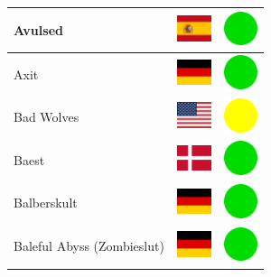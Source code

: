 \documentclass[12pt, a4paper, twoside]{report}
\begin{document}
\begin{center}
\begin{longtable}{|p{5cm}|p{2cm}|p{2cm}|}
 Avulsed                                                    & \includegraphics[width=1cm]{../img/flags/es} &   \includegraphics[width=1cm]{../likes/y} \\ \hline
 Axit                                                       & \includegraphics[width=1cm]{../img/flags/de} &   \includegraphics[width=1cm]{../likes/y} \\ \hline
 Bad Wolves                                                 & \includegraphics[width=1cm]{../img/flags/us} &   \includegraphics[width=1cm]{../likes/m} \\ \hline
 Baest                                                      & \includegraphics[width=1cm]{../img/flags/dk} &   \includegraphics[width=1cm]{../likes/y} \\ \hline
 Balberskult                                                & \includegraphics[width=1cm]{../img/flags/de} &   \includegraphics[width=1cm]{../likes/y} \\ \hline
 Baleful Abyss (Zombieslut)                                 & \includegraphics[width=1cm]{../img/flags/de} &   \includegraphics[width=1cm]{../likes/y} \\ \hline

\end{longtable}
\end{center}
\end{document}
